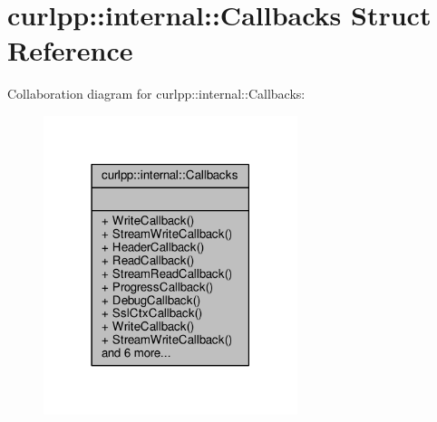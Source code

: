 \hypertarget{structcurlpp_1_1internal_1_1Callbacks}{\section{curlpp\-:\-:internal\-:\-:Callbacks Struct Reference}
\label{structcurlpp_1_1internal_1_1Callbacks}
}


Collaboration diagram for curlpp\-:\-:internal\-:\-:Callbacks\-:\nopagebreak
\begin{figure}[H]
\begin{center}
\leavevmode
\includegraphics[width=210pt]{structcurlpp_1_1internal_1_1Callbacks__coll__graph}
\end{center}
\end{figure}
